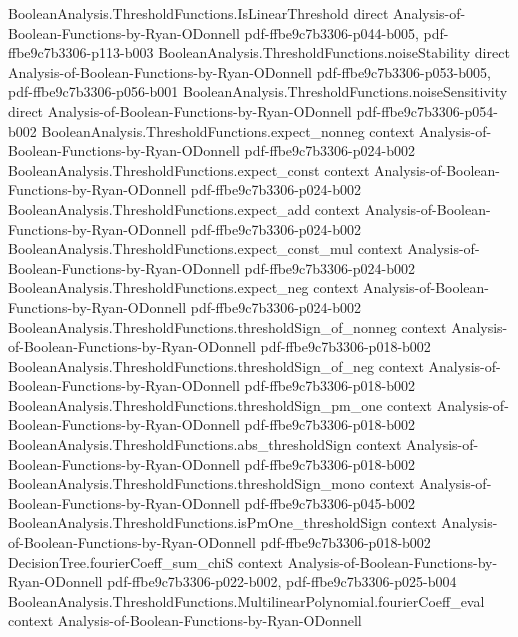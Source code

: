 \begin{theorem}
  {BooleanAnalysis.ThresholdFunctions.IsLinearThreshold}
  {direct}
  {Analysis-of-Boolean-Functions-by-Ryan-ODonnell}
  {pdf-ffbe9c7b3306-p044-b005,
    pdf-ffbe9c7b3306-p113-b003}
\proofstep
  {BooleanAnalysis.ThresholdFunctions.noiseStability}
  {direct}
  {Analysis-of-Boolean-Functions-by-Ryan-ODonnell}
  {pdf-ffbe9c7b3306-p053-b005,
    pdf-ffbe9c7b3306-p056-b001}
\proofstep
  {BooleanAnalysis.ThresholdFunctions.noiseSensitivity}
  {direct}
  {Analysis-of-Boolean-Functions-by-Ryan-ODonnell}
  {pdf-ffbe9c7b3306-p054-b002}
\proofstep
  {BooleanAnalysis.ThresholdFunctions.expect_nonneg}
  {context}
  {Analysis-of-Boolean-Functions-by-Ryan-ODonnell}
  {pdf-ffbe9c7b3306-p024-b002}
\proofstep
  {BooleanAnalysis.ThresholdFunctions.expect_const}
  {context}
  {Analysis-of-Boolean-Functions-by-Ryan-ODonnell}
  {pdf-ffbe9c7b3306-p024-b002}
\proofstep
  {BooleanAnalysis.ThresholdFunctions.expect_add}
  {context}
  {Analysis-of-Boolean-Functions-by-Ryan-ODonnell}
  {pdf-ffbe9c7b3306-p024-b002}
\proofstep
  {BooleanAnalysis.ThresholdFunctions.expect_const_mul}
  {context}
  {Analysis-of-Boolean-Functions-by-Ryan-ODonnell}
  {pdf-ffbe9c7b3306-p024-b002}
\proofstep
  {BooleanAnalysis.ThresholdFunctions.expect_neg}
  {context}
  {Analysis-of-Boolean-Functions-by-Ryan-ODonnell}
  {pdf-ffbe9c7b3306-p024-b002}
\proofstep
  {BooleanAnalysis.ThresholdFunctions.thresholdSign_of_nonneg}
  {context}
  {Analysis-of-Boolean-Functions-by-Ryan-ODonnell}
  {pdf-ffbe9c7b3306-p018-b002}
\proofstep
  {BooleanAnalysis.ThresholdFunctions.thresholdSign_of_neg}
  {context}
  {Analysis-of-Boolean-Functions-by-Ryan-ODonnell}
  {pdf-ffbe9c7b3306-p018-b002}
\proofstep
  {BooleanAnalysis.ThresholdFunctions.thresholdSign_pm_one}
  {context}
  {Analysis-of-Boolean-Functions-by-Ryan-ODonnell}
  {pdf-ffbe9c7b3306-p018-b002}
\proofstep
  {BooleanAnalysis.ThresholdFunctions.abs_thresholdSign}
  {context}
  {Analysis-of-Boolean-Functions-by-Ryan-ODonnell}
  {pdf-ffbe9c7b3306-p018-b002}
\proofstep
  {BooleanAnalysis.ThresholdFunctions.thresholdSign_mono}
  {context}
  {Analysis-of-Boolean-Functions-by-Ryan-ODonnell}
  {pdf-ffbe9c7b3306-p045-b002}
\proofstep
  {BooleanAnalysis.ThresholdFunctions.isPmOne_thresholdSign}
  {context}
  {Analysis-of-Boolean-Functions-by-Ryan-ODonnell}
  {pdf-ffbe9c7b3306-p018-b002}
\proofstep
  {DecisionTree.fourierCoeff_sum_chiS}
  {context}
  {Analysis-of-Boolean-Functions-by-Ryan-ODonnell}
  {pdf-ffbe9c7b3306-p022-b002,
    pdf-ffbe9c7b3306-p025-b004}
\proofstep
  {BooleanAnalysis.ThresholdFunctions.MultilinearPolynomial.fourierCoeff_eval}
  {context}
  {Analysis-of-Boolean-Functions-by-Ryan-ODonnell}

\end{theorem}

